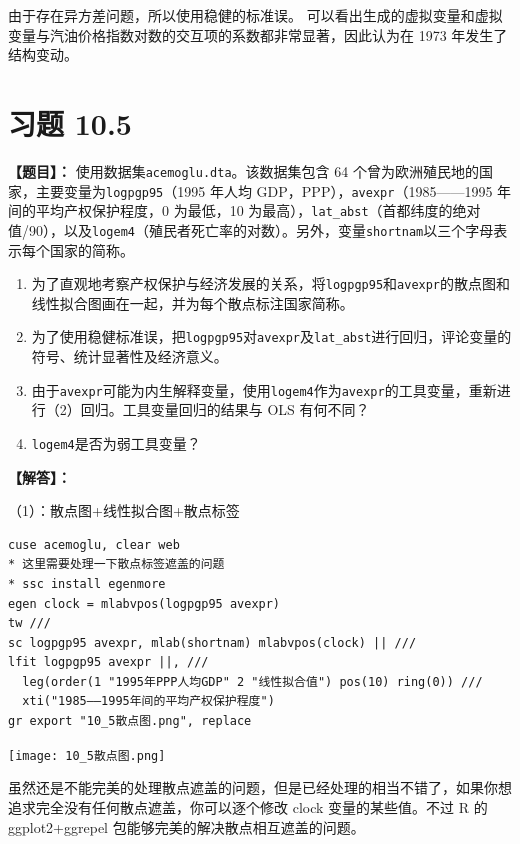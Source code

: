 \documentclass[cn,fancy,blue,11pt]{elegantbook}
\begin{document}
由于存在异方差问题，所以使用稳健的标准误。
可以看出生成的虚拟变量和虚拟变量与汽油价格指数对数的交互项的系数都非常显著，因此认为在 1973 年发生了结构变动。

\hypertarget{section-50}{%
\section{习题 10.5}\label{section-50}}

\textbf{【题目】：}
使用数据集\lstinline{acemoglu.dta}。该数据集包含 64 个曾为欧洲殖民地的国家，主要变量为\lstinline{logpgp95}（1995 年人均 GDP，PPP），\lstinline{avexpr}（1985------1995 年间的平均产权保护程度，0 为最低，10 为最高），\lstinline{lat_abst}（首都纬度的绝对值/90），以及\lstinline{logem4}（殖民者死亡率的对数）。另外，变量\lstinline{shortnam}以三个字母表示每个国家的简称。

\begin{enumerate}
\item
  为了直观地考察产权保护与经济发展的关系，将\lstinline{logpgp95}和\lstinline{avexpr}的散点图和线性拟合图画在一起，并为每个散点标注国家简称。
\item
  为了使用稳健标准误，把\lstinline{logpgp95}对\lstinline{avexpr}及\lstinline{lat_abst}进行回归，评论变量的符号、统计显著性及经济意义。
\item
  由于\lstinline{avexpr}可能为内生解释变量，使用\lstinline{logem4}作为\lstinline{avexpr}的工具变量，重新进行（2）回归。工具变量回归的结果与 OLS 有何不同？
\item
  \lstinline{logem4}是否为弱工具变量？
\end{enumerate}

\textbf{【解答】：}

（1）：散点图+线性拟合图+散点标签

\begin{lstlisting}
cuse acemoglu, clear web
* 这里需要处理一下散点标签遮盖的问题
* ssc install egenmore
egen clock = mlabvpos(logpgp95 avexpr)
tw ///
sc logpgp95 avexpr, mlab(shortnam) mlabvpos(clock) || ///
lfit logpgp95 avexpr ||, ///
  leg(order(1 "1995年PPP人均GDP" 2 "线性拟合值") pos(10) ring(0)) ///
  xti("1985——1995年间的平均产权保护程度")
gr export "10_5散点图.png", replace
\end{lstlisting}

\noindent\texttt{[image: 10\_5散点图.png]}

虽然还是不能完美的处理散点遮盖的问题，但是已经处理的相当不错了，如果你想追求完全没有任何散点遮盖，你可以逐个修改 clock 变量的某些值。不过 R 的 ggplot2+ggrepel 包能够完美的解决散点相互遮盖的问题。
\end{document}
